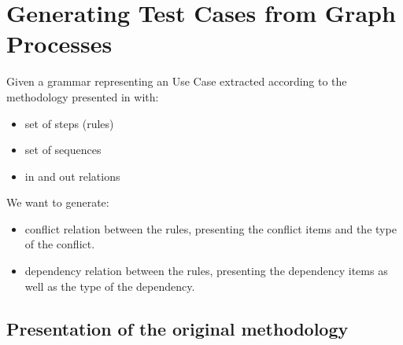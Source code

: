 \chapter{Generating Test Cases from Graph Processes}

Given a grammar representing an Use Case extracted according to the methodology presented in \cite{Junior2015} with:

\begin{itemize}
\item set of steps (rules)
\item set of sequences
\item in and out relations
\end{itemize}

We want to generate:

\begin{itemize}
\item conflict relation between the rules, presenting the conflict items and the type of the conflict.
\item dependency relation between the rules, presenting the dependency items as well as the type of the dependency.
\end{itemize}

\section{Presentation of the original methodology}





